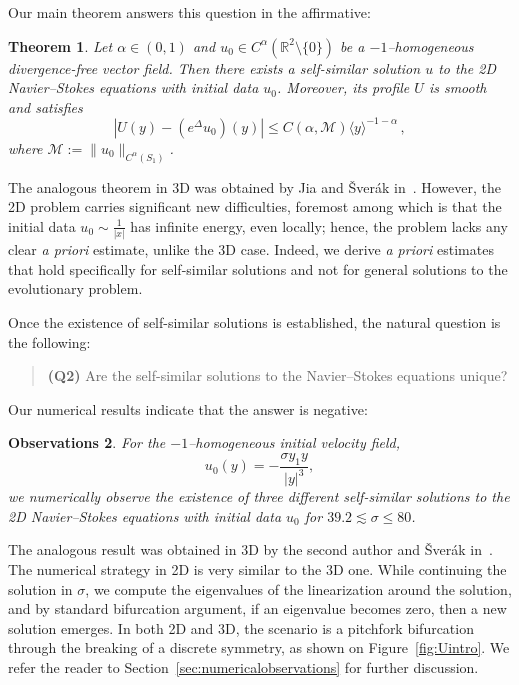\documentclass[12pt,reqno]{amsart}
\theoremstyle{plain}
\newtheorem{theorem}{Theorem}[section]
\newtheorem{result}[theorem]{Observations}
\theoremstyle{definition}
\newcommand{\R}{\mathbb{R}}
\newcommand{\M}{\mathcal{M}}
\renewcommand{\:}{\colon}
\numberwithin{equation}{section}
\numberwithin{figure}{section}
\begin{document}
Our main theorem answers this question in the affirmative:

\begin{theorem} \label{thm:main}
Let $\alpha \in (0,1)$ and  $u_0 \in C^\alpha(\R^2 \setminus \{0\})$ be a $-1$--homogeneous divergence-free vector field. Then there exists a self-similar solution $u$ to the 2D Navier--Stokes equations with initial data $u_0$. Moreover, its profile $U$ is smooth and satisfies 
	\begin{equation}
		|U(y) - (e^\Delta u_0) (y)| \le C(\alpha, \M) \langle y \rangle^{-1-\alpha} \, ,
	\end{equation}
where $\M := \|u_0\|_{C^\alpha(S_1)}$. 
\end{theorem}

The analogous theorem in 3D was obtained by Jia and \v{S}ver{\'a}k in~\cite{jiasverakselfsim}. However, the 2D problem carries significant new difficulties, foremost among which is that the initial data $u_0 \sim \frac{1}{|x|}$ has infinite energy, even locally; hence, the problem lacks any clear \emph{a priori} estimate, unlike the 3D case. Indeed, we derive \emph{a priori} estimates that hold specifically for self-similar solutions and not for general solutions to the evolutionary problem.




Once the existence of self-similar solutions is established, the natural question is the following:
\begin{quote}
\textbf{(Q2)} Are the self-similar solutions to the Navier--Stokes equations unique?
\end{quote}
Our numerical results indicate that the answer is negative:
\begin{result}\label{numerics}
	For the $-1$--homogeneous initial velocity field,
	\begin{equation}
		u_{0}(y) = -\frac{\sigma y_{1}y}{|y|^{3}},
	\end{equation}
	we numerically observe the existence of three different self-similar solutions to the 2D Navier--Stokes equations with initial data $u_0$ for $39.2\lesssim\sigma\leq80$.
\end{result}
The analogous result was obtained in 3D by the second author and \v{S}ver{\'a}k in~\cite{guillodsverak}. The numerical strategy in 2D is very similar to the 3D one. While continuing the solution in $\sigma$, we compute the eigenvalues of the linearization around the solution, and by standard bifurcation argument, if an eigenvalue becomes zero, then a new solution emerges. In both 2D and 3D, the scenario is a pitchfork bifurcation through the breaking of a discrete symmetry, as shown on Figure~\ref{fig:Uintro}. We refer the reader to Section~\ref{sec:numericalobservations} for further discussion.
\end{document}
